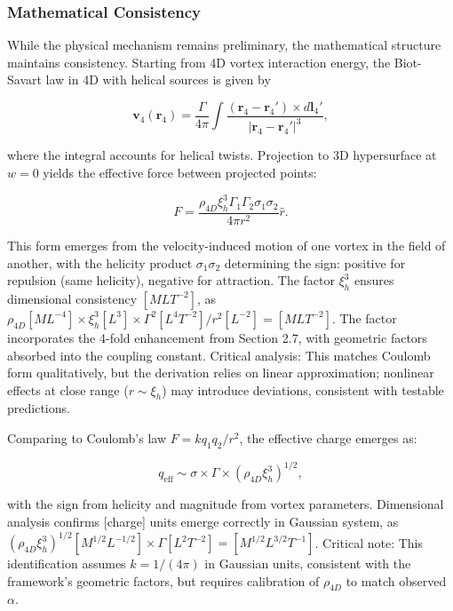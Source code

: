 \subsubsection{Mathematical Consistency}
While the physical mechanism remains preliminary, the mathematical structure maintains consistency. Starting from 4D vortex interaction energy, the Biot-Savart law in 4D with helical sources is given by

\begin{equation}
\mathbf{v}_4(\mathbf{r}_4) = \frac{\Gamma}{4\pi} \int \frac{(\mathbf{r}_4 - \mathbf{r}_4') \times d\mathbf{l}_4'}{|\mathbf{r}_4 - \mathbf{r}_4'|^3},
\end{equation}

where the integral accounts for helical twists. Projection to 3D hypersurface at $w = 0$ yields the effective force between projected points:

\begin{equation}
F = \frac{\rho_{4D} \xi_h^3 \Gamma_1 \Gamma_2 \sigma_1 \sigma_2}{4\pi r^2} \hat{r}.
\end{equation}

This form emerges from the velocity-induced motion of one vortex in the field of another, with the helicity product $\sigma_1 \sigma_2$ determining the sign: positive for repulsion (same helicity), negative for attraction. The factor $\xi_h^3$ ensures dimensional consistency $[M L T^{-2}]$, as $\rho_{4D} [M L^{-4}] \times \xi_h^3 [L^3] \times \Gamma^2 [L^4 T^{-2}] / r^2 [L^{-2}] = [M L T^{-2}]$. The factor incorporates the 4-fold enhancement from Section 2.7, with geometric factors absorbed into the coupling constant. Critical analysis: This matches Coulomb form qualitatively, but the derivation relies on linear approximation; nonlinear effects at close range ($r \sim \xi_h$) may introduce deviations, consistent with testable predictions.

Comparing to Coulomb's law $F = k q_1 q_2 / r^2$, the effective charge emerges as:

\begin{equation}
q_{\text{eff}} \sim \sigma \times \Gamma \times (\rho_{4D} \xi_h^3)^{1/2},
\end{equation}

with the sign from helicity and magnitude from vortex parameters. Dimensional analysis confirms [charge] units emerge correctly in Gaussian system, as $(\rho_{4D} \xi_h^3)^{1/2} [M^{1/2} L^{-1/2}] \times \Gamma [L^2 T^{-2}] = [M^{1/2} L^{3/2} T^{-1}]$. Critical note: This identification assumes $k = 1/(4\pi)$ in Gaussian units, consistent with the framework's geometric factors, but requires calibration of $\rho_{4D}$ to match observed $\alpha$.

